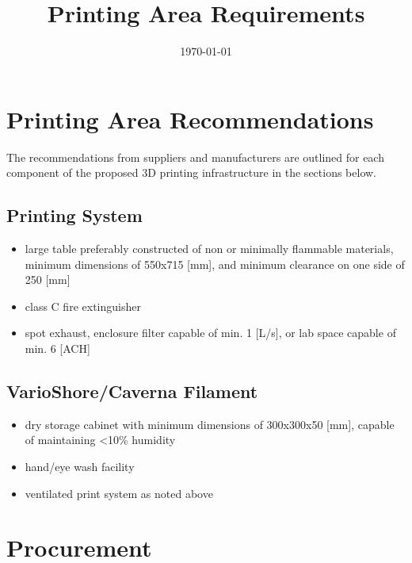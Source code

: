 \documentclass[11pt]{article}
\date{\today}
\title{Printing Area Requirements}
\begin{document}
\pretitle{\begin{flushleft}\fontsize{18bp}{18bp}\selectfont}
  \posttitle{\par\end{flushleft}}
\predate{\begin{flushleft}}
\postdate{\end{flushleft}}

\maketitle

\section{Printing Area Recommendations}
\label{sec:orgd16247e}
The recommendations from suppliers and manufacturers are outlined for each component of the proposed 3D printing infrastructure in the sections below.

\subsection{Printing System}
\label{sec:org8f5b95f}
\begin{itemize}
\item large table preferably constructed of non or minimally flammable materials, minimum dimensions of 550x715 [mm], and minimum clearance on one side of 250 [mm]
\item class C fire extinguisher
\item spot exhaust, enclosure filter capable of min. 1 [L/s], or lab space capable of min. 6 [ACH]
\end{itemize}

\subsection{VarioShore/Caverna Filament}
\label{sec:org11e2e06}
\begin{itemize}
\item dry storage cabinet with minimum dimensions of 300x300x50 [mm], capable of maintaining <10\% humidity
\item hand/eye wash facility
\item ventilated print system as noted above
\end{itemize}

\section{Procurement}
\label{sec:orgb02f214}
\end{document}
